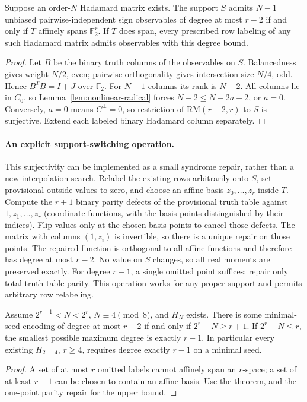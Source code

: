 \begin{theorem}
\label{thm:nonlinear-fixed-support}
Suppose an order-$N$ Hadamard matrix exists. The support $S$ admits
$N-1$ unbiased pairwise-independent sign observables of degree at most
$r-2$ if and only if $T$ affinely spans $\mathbb F_2^r$.
If $T$ does span, every prescribed row labeling of any such Hadamard
matrix admits observables with this degree bound.
\end{theorem}
\begin{proof}
Let $B$ be the binary truth columns of the observables on $S$.
Balancedness gives weight $N/2$, even; pairwise orthogonality gives
intersection size $N/4$, odd. Hence $B^TB=I+J$ over $\mathbb F_2$.
For $N-1$ columns its rank is $N-2$. All columns lie in $C_0$, so
Lemma~\ref{lem:nonlinear-radical} forces
$N-2\le N-2a-2$, or $a=0$.
Conversely, $a=0$ means $C^\perp=0$, so restriction of
$\mathrm{RM}(r-2,r)$ to $S$ is surjective. Extend each labeled binary
Hadamard column separately.
\end{proof}

\paragraph{An explicit support-switching operation.}
This surjectivity can be implemented as a small syndrome repair, rather
than a new interpolation search. Relabel the existing rows arbitrarily
onto $S$, set provisional outside values to zero, and choose an affine
basis $z_0,\ldots,z_r$ inside $T$. Compute the $r+1$ binary parity defects
of the provisional truth table against $1,z_1,\ldots,z_r$ (coordinate
functions, with the basis points distinguished by their indices).
Flip values only at the chosen basis points to cancel those defects.
The matrix with columns $(1,z_i)$ is invertible, so there is a unique
repair on those points. The repaired function is orthogonal to all
affine functions and therefore has degree at most $r-2$.
No value on $S$ changes, so all real moments are preserved exactly.
For degree $r-1$, a single omitted point suffices: repair only total
truth-table parity. This operation works for any proper support and
permits arbitrary row relabeling.

\begin{corollary}
\label{cor:nonlinear-degree-saturation}
Assume $2^{r-1}<N<2^r$, $N\equiv4\pmod8$, and $H_N$ exists.
There is some minimal-seed encoding of degree at most $r-2$ if and
only if $2^r-N\ge r+1$. If $2^r-N\le r$, the smallest possible maximum
degree is exactly $r-1$. In particular every existing
$H_{2^r-4}$, $r\ge4$, requires degree exactly $r-1$ on a minimal seed.
\end{corollary}
\begin{proof}
A set of at most $r$ omitted labels cannot affinely span an $r$-space;
a set of at least $r+1$ can be chosen to contain an affine basis.
Use the theorem, and the one-point parity repair for the upper bound.
\end{proof}

